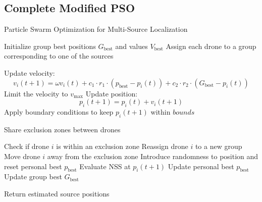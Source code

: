 \subsection{Complete Modified PSO}
\begin{algorithm}
    \caption{Particle Swarm Optimization for Multi-Source Localization}\label{alg:PSO}
    \begin{algorithmic}[1]
        \State Initialize group best positions $G_{\text{best}}$ and values $V_{\text{best}}$
        \State Assign each drone to a group corresponding to one of the sources
        
                \State Update velocity:
                \[
                    v_i(t+1) = \omega v_i(t) + c_1 \cdot r_1 \cdot (p_{\text{best}} - p_i(t)) + c_2 \cdot r_2 \cdot (G_{\text{best}} - p_i(t))
                \]
                \State Limit the velocity to $v_{\text{max}}$
                \State Update position:
                \[
                    p_i(t+1) = p_i(t) + v_i(t+1)
                \]
                \State Apply boundary conditions to keep $p_i(t+1)$ within $bounds$
                
                            \State Share exclusion zones between drones
                        \EndIf
                    \EndIf
                \EndFor
                
                \State Check if drone $i$ is within an exclusion zone
                        \State Reassign drone $i$ to a new group
                    \Else
                        \State Move drone $i$ away from the exclusion zone
                        \State Introduce randomness to position and reset personal best $p_{\text{best}}$
                    \EndIf
                \Else
                    \State Evaluate NSS at $p_i(t+1)$
                        \State Update personal best $p_{\text{best}}$
                    \EndIf
                        \State Update group best $G_{\text{best}}$
                    \EndIf
                \EndIf
            \EndFor
        \EndFor
        
        \State Return estimated source positions
    \end{algorithmic}
\end{algorithm}

    